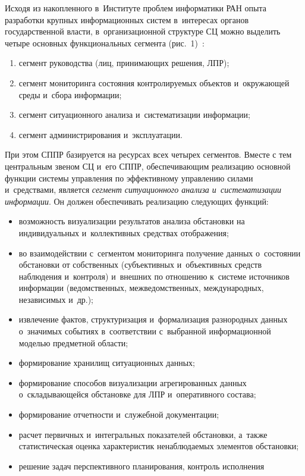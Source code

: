 \begin{multicols}{2}
    Исходя из накопленного в~Институте проблем информатики РАН опыта 
разработки крупных информационных сис\-тем в~интересах органов 
государственной власти, в~организационной структуре СЦ можно выделить 
четыре основных функциональных сегмента (рис.~1)~\cite{8-zat}:
    \begin{enumerate}[(1)]
\item сегмент руководства (лиц, принимающих решения, ЛПР); 
\item сегмент мониторинга состояния контролируемых объектов 
и~окружающей среды и~сбора информации; 
\item сегмент ситуационного анализа и~сис\-те\-ма\-ти\-за\-ции информации;
\item сегмент администрирования и~эксплуатации.
\end{enumerate}
    При этом СППР базируется на ресурсах всех четырех сегментов. Вместе 
с тем центральным звеном СЦ и~его СППР, обеспечивающим реализацию 
основной функции сис\-те\-мы управ\-ле\-ния по эффективному управлению 
силами и~средствами, является \textit{сегмент ситуационного анализа 
и~сис\-те\-ма\-ти\-за\-ции информации}. Он должен обеспечивать реализацию 
следующих функций:
    \begin{itemize}
\item возможность визуализации результатов анализа обстановки на 
индивидуальных и~коллективных средствах отображения;
\item во взаимодействии с~сегментом мониторинга получение данных 
о~состоянии обстановки от собственных (субъективных и~объективных 
средств наблюдения и~контроля) и~внешних по отношению к~сис\-те\-ме 
источников информации (ведомственных, межведомственных, 
международных, независимых и~др.);
\item извлечение фактов, структуризация и~формализация разнородных 
данных о~значимых событиях в~соответствии с~выбранной информационной 
моделью предметной области;
\item формирование хранилищ ситуационных данных;
\item формирование способов визуализации агрегированных данных 
о~складывающейся обстановке для ЛПР и~оперативного состава;
\item формирование отчетности и~служебной документации;
\item расчет первичных и~интегральных показателей обстановки, а~также 
статистическая оценка характеристик ненаблюдаемых элементов обстановки;
\item решение задач перспективного планирования, контроль исполнения 

\end{itemize}
\end{multicols}
